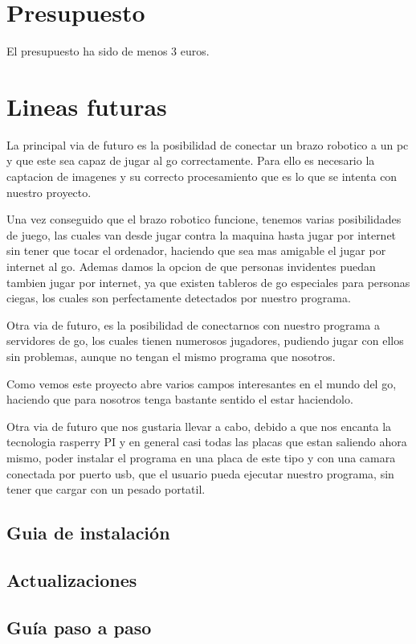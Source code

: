 \documentclass[12pt,a4paper]{report}
\begin{document}
\chapter{Presupuesto}
El presupuesto ha sido de menos 3 euros.

\chapter{Lineas futuras}


La principal via de futuro es la posibilidad de conectar un brazo robotico a un pc y que este sea capaz de jugar al go correctamente. Para ello es necesario la captacion de imagenes y su correcto procesamiento que es lo que se intenta con nuestro proyecto. 

Una vez conseguido que el brazo robotico funcione, tenemos varias posibilidades de juego, las cuales van desde jugar contra la maquina hasta jugar por internet sin tener que tocar el ordenador, haciendo que sea mas amigable el jugar por internet al go. Ademas damos la opcion de que personas invidentes puedan tambien jugar por internet, ya que existen tableros de go especiales para personas ciegas, los cuales son perfectamente detectados por nuestro programa.

Otra via de futuro, es la posibilidad de conectarnos con nuestro programa a servidores de go, los cuales tienen numerosos jugadores, pudiendo jugar con ellos sin problemas, aunque no tengan el mismo programa que nosotros.

Como vemos este proyecto abre varios campos interesantes en el mundo del go, haciendo que para nosotros tenga bastante sentido el estar haciendolo. 

Otra via de futuro que nos gustaria llevar a cabo, debido a que nos encanta la tecnologia rasperry PI y en general casi todas las placas que estan saliendo ahora mismo, poder instalar el programa en una placa de este tipo y con una camara conectada por puerto usb, que el usuario pueda ejecutar nuestro programa, sin tener que cargar con un pesado portatil. 

\section{Guia de instalación}
\section{Actualizaciones}
\section{Guía paso a paso}
\end{document}
